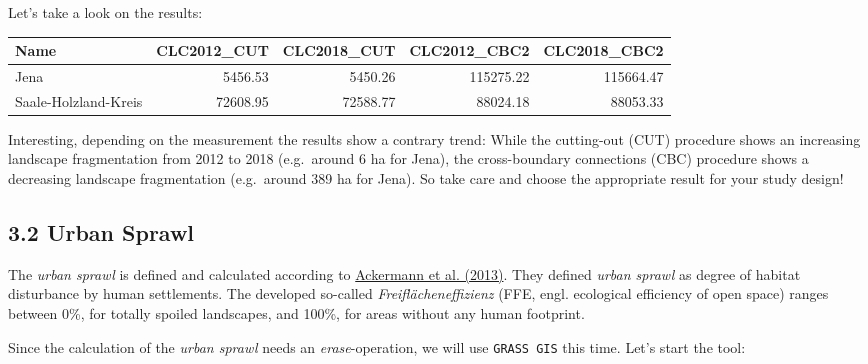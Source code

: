 \documentclass[]{article}
\begin{document}
Let's take a look on the results:

\begin{longtable}[]{@{}lrrrr@{}}
\toprule
Name & CLC2012\_CUT & CLC2018\_CUT & CLC2012\_CBC2 &
CLC2018\_CBC2\tabularnewline
\midrule
\endhead
Jena & 5456.53 & 5450.26 & 115275.22 & 115664.47\tabularnewline
Saale-Holzland-Kreis & 72608.95 & 72588.77 & 88024.18 &
88053.33\tabularnewline
\bottomrule
\end{longtable}

Interesting, depending on the measurement the results show a contrary
trend: While the cutting-out (CUT) procedure shows an increasing
landscape fragmentation from 2012 to 2018 (e.g.~around 6 ha for Jena),
the cross-boundary connections (CBC) procedure shows a decreasing
landscape fragmentation (e.g.~around 389 ha for Jena). So take care and
choose the appropriate result for your study design!

\subsection{3.2 Urban Sprawl}\label{urban-sprawl}

The \emph{urban sprawl} is defined and calculated according to
\href{https://www.schulthess.com/buchshop/detail/ISBN-9783784340326/Ackermann-Werne-Schweiger-Manue-Sukopp-Ulrich-fuer-Naturschutz-BfN-Bundesam-Editor/Indikatoren-zur-biologischen-Vielfalt?bpmbutton211549=1\&bpmtoken=}{Ackermann
et al. (2013)}. They defined \emph{urban sprawl} as degree of habitat
disturbance by human settlements. The developed so-called
\emph{Freiflächeneffizienz} (FFE, engl. ecological efficiency of open
space) ranges between 0\%, for totally spoiled landscapes, and 100\%,
for areas without any human footprint.

Since the calculation of the \emph{urban sprawl} needs an
\emph{erase}-operation, we will use \texttt{GRASS\ GIS} this time. Let's
start the tool:
\end{document}
